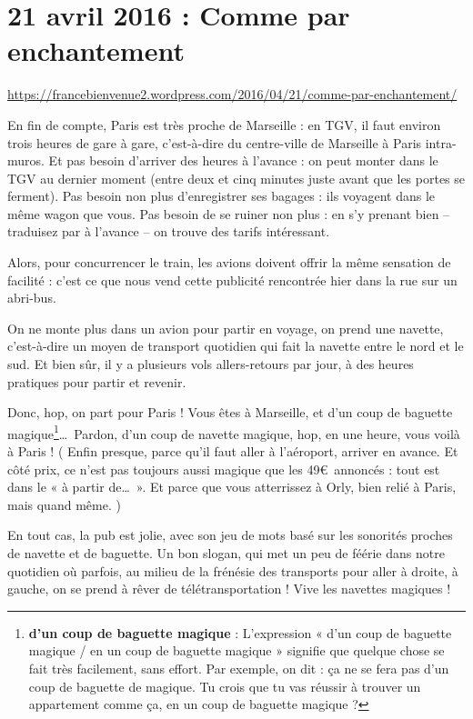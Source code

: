 \documentclass[11pt, french]{report}
\begin{document}
\chapter{21 avril 2016 : Comme par enchantement}

\url{https://francebienvenue2.wordpress.com/2016/04/21/comme-par-enchantement/}

\vfill

En fin de compte, Paris est très proche de Marseille : en TGV, il faut environ
trois heures de gare à gare, c'est-à-dire du centre-ville de Marseille à Paris
intra-muros. Et pas besoin d'arriver des heures à l'avance : on peut monter
dans le TGV au dernier moment (entre deux et cinq minutes juste avant que les
portes se ferment).  Pas besoin non plus d'enregistrer ses bagages : ils
voyagent dans le même wagon que vous. Pas besoin de se ruiner non plus : en
s'y prenant bien -- traduisez par à l'avance -- on trouve des tarifs
intéressant.

Alors, pour concurrencer le train, les avions doivent offrir la même sensation
de facilité : c’est ce que nous vend cette publicité rencontrée hier dans la
rue sur un abri-bus.

On ne monte plus dans un avion pour partir en voyage, on prend une navette,
c’est-à-dire un moyen de transport quotidien qui fait la navette entre le nord
et le sud. Et bien sûr, il y a plusieurs vols allers-retours par jour, à des
heures pratiques pour partir et revenir.

Donc, hop, on part pour Paris ! Vous êtes à Marseille, et d’un coup de baguette
magique\footnote{\textbf{d’un coup de baguette magique} : L’expression
  « d’un coup de baguette magique / en un coup de baguette magique » signifie
  que quelque chose se fait très facilement, sans effort.
  Par exemple, on dit : ça ne se fera pas d’un coup de baguette de magique.
  Tu crois que tu vas réussir à trouver un appartement comme ça, en un coup de
  baguette magique ? }\ldots\ Pardon, d’un coup de navette magique, hop, en
une heure, vous voilà à Paris ! ( Enfin presque, parce qu’il faut aller à
l’aéroport, arriver en avance. Et côté prix, ce n’est pas toujours aussi
magique que les 49\euro\ annoncés : tout est dans le « à partir de\ldots\ ». Et
parce que vous atterrissez à Orly, bien relié à Paris, mais quand même. )

En tout cas, la pub est jolie, avec son jeu de mots basé sur les sonorités
proches de navette et de baguette. Un bon slogan, qui met un peu de féérie dans
notre quotidien où parfois, au milieu de la frénésie des transports pour aller
à droite, à gauche, on se prend à rêver de télétransportation ! Vive les
navettes magiques ! 

\vfill
\end{document}
